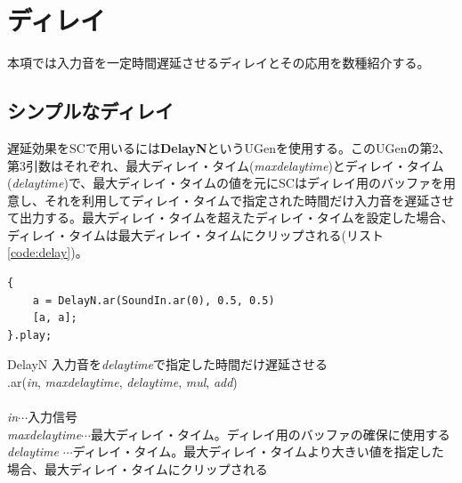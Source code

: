 \documentclass{jsarticle}
\begin{document}
\section{ディレイ}
本項では入力音を一定時間遅延させるディレイとその応用を数種紹介する。

\subsection{シンプルなディレイ}

遅延効果をSCで用いるには{\bf DelayN}というUGenを使用する。このUGenの第2、第3引数はそれぞれ、最大ディレイ・タイム({\it maxdelaytime})とディレイ・タイム({\it delaytime})で、最大ディレイ・タイムの値を元にSCはディレイ用のバッファを用意し、それを利用してディレイ・タイムで指定された時間だけ入力音を遅延させて出力する。最大ディレイ・タイムを超えたディレイ・タイムを設定した場合、ディレイ・タイムは最大ディレイ・タイムにクリップされる(リスト\ref{code:delay})。
\begin{lstlisting}[caption=ディレイ, label=code:delay]
{
	a = DelayN.ar(SoundIn.ar(0), 0.5, 0.5)
	[a, a];
}.play;
\end{lstlisting}

\begin{itembox}[l]{DelayN}
	{\footnotesize 
	入力音を{\it delaytime}で指定した時間だけ遅延させる\\
	.ar({\it in}, {\it maxdelaytime}, {\it delaytime}, {\it mul}, {\it add})\\\\
	{\it in}$\cdots$入力信号\\
	{\it maxdelaytime}$\cdots$最大ディレイ・タイム。ディレイ用のバッファの確保に使用する\\
	{\it delaytime} $\cdots$ディレイ・タイム。最大ディレイ・タイムより大きい値を指定した場合、最大ディレイ・タイムにクリップされる
	}
\end{itembox}
\end{document}
